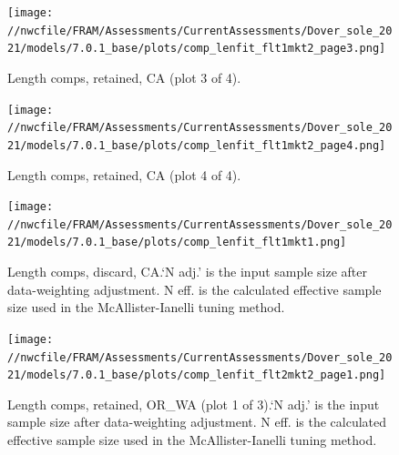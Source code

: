 \documentclass[11pt,
  english,
  a4paper,
]{article}
\begin{document}
\begin{figure}
\centering
\texttt{[image: //nwcfile/FRAM/Assessments/CurrentAssessments/Dover\_sole\_2021/models/7.0.1\_base/plots/comp\_lenfit\_flt1mkt2\_page3.png]}
\caption{Length comps, retained, CA (plot 3 of 4).\label{fig:comp_lenfit_flt1mkt2_page3}}
\end{figure}

\tagmcend\tagstructend


\begin{figure}
\centering
\texttt{[image: //nwcfile/FRAM/Assessments/CurrentAssessments/Dover\_sole\_2021/models/7.0.1\_base/plots/comp\_lenfit\_flt1mkt2\_page4.png]}
\caption{Length comps, retained, CA (plot 4 of 4).\label{fig:comp_lenfit_flt1mkt2_page4}}
\end{figure}

\tagmcend\tagstructend


\begin{figure}
\centering
\texttt{[image: //nwcfile/FRAM/Assessments/CurrentAssessments/Dover\_sole\_2021/models/7.0.1\_base/plots/comp\_lenfit\_flt1mkt1.png]}
\caption{Length comps, discard, CA.`N adj.' is the input sample size after data-weighting adjustment. N eff. is the calculated effective sample size used in the McAllister-Ianelli tuning method.\label{fig:comp_lenfit_flt1mkt1}}
\end{figure}

\tagmcend\tagstructend


\begin{figure}
\centering
\texttt{[image: //nwcfile/FRAM/Assessments/CurrentAssessments/Dover\_sole\_2021/models/7.0.1\_base/plots/comp\_lenfit\_flt2mkt2\_page1.png]}
\caption{Length comps, retained, OR\_WA (plot 1 of 3).`N adj.' is the input sample size after data-weighting adjustment. N eff. is the calculated effective sample size used in the McAllister-Ianelli tuning method.\label{fig:comp_lenfit_flt2mkt2_page1}}
\end{figure}
\end{document}
